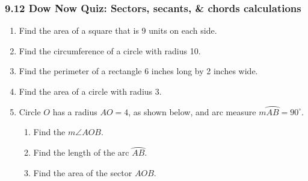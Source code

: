 \documentclass[12pt, twoside]{article}
\begin{document}
\subsubsection*{9.12 Dow Now Quiz: Sectors, secants, \& chords calculations}
 \begin{enumerate}

   \item Find the area of a square that is 9 units on each side. \vspace{1.5cm}
   \item Find the circumference of a circle with radius 10. \vspace{1.5cm}
   \item Find the perimeter of a rectangle 6 inches long by 2 inches wide. \vspace{1.5cm}
   \item Find the area of a circle with radius 3. \vspace{1.5cm}

   \item Circle $O$ has a radius $AO=4$, as shown below, and arc measure $m \wideparen{AB}=90^\circ$.
         \begin{center}
       \end{center}
       \begin{enumerate}
         \item Find the $m \angle AOB$. \vspace{1.5cm}
         \item Find the length of the arc $\wideparen{AB}$. \vspace{1.5cm}
         \item Find the area of the sector $AOB$. %
       \end{enumerate}

\newpage


\end{enumerate}
\end{document}
